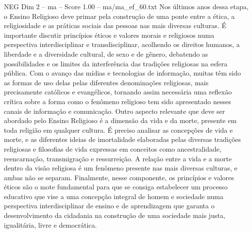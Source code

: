 \begin{textsample}{NEG Dim 2 – ma – Score 1.00 – ma/ma\_ef\_60.txt}
Nos últimos anos dessa etapa, o Ensino Religioso deve primar pela construção de uma ponte entre a ética, a religiosidade e as práticas sociais das pessoas nas mais diversas culturas.
É importante discutir princípios éticos e valores morais e religiosos numa perspectiva interdisciplinar e transdisciplinar, acolhendo os direitos humanos, a liberdade e a diversidade cultural, de sexo e de gênero, debatendo as possibilidades e os limites da interferência das tradições religiosas na esfera pública.
Com o avanço das mídias e tecnologias de informação, muitas têm sido as formas de uso delas pelas diferentes denominações religiosas, mais precisamente católicos e evangélicos, tornando assim necessária uma reflexão crítica sobre a forma como o fenômeno religioso tem sido apresentado nesses canais de informação e comunicação.
Outro aspecto relevante que deve ser abordado pelo Ensino Religioso é a dimensão da vida e da morte, presente em toda religião em qualquer cultura.
É preciso analisar as concepções de vida e morte, e as diferentes ideias de imortalidade elaboradas pelas diversas tradições religiosas e filosofias de vida expressas em conceitos como ancestralidade, reencarnação, transmigração e ressurreição.
A relação entre a vida e a morte dentro da visão religiosa é um fenômeno presente nas mais diversas culturas, e ambas não se separam.
Finalmente, nesse componente, os princípios e valores éticos são o mote fundamental para que se consiga estabelecer um processo educativo que vise a uma concepção integral de homem e sociedade numa perspectiva interdisciplinar de ensino e de aprendizagem que garanta o desenvolvimento da cidadania na construção de uma sociedade mais justa, igualitária, livre e democrática.

\end{textsample}
